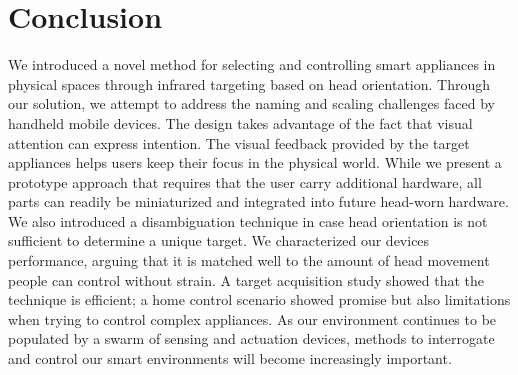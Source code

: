 \documentclass{sigchi}
\begin{document}
\section{Conclusion}
We introduced a novel method for selecting and controlling smart appliances in physical spaces through infrared targeting based on head orientation. Through our solution, we attempt to address the naming and scaling challenges faced by handheld mobile devices. The design takes advantage of the fact that visual attention can express intention. The visual feedback provided by the target appliances helps users keep their focus in the physical world. While we present a prototype approach that requires that the user carry additional hardware, all parts can readily be miniaturized and integrated into future head-worn hardware. We also introduced a disambiguation technique in case head orientation is not sufficient to determine a unique target. We characterized our devices performance, arguing that it is matched well to the amount of head movement people can control without strain. A target acquisition study showed that the technique is efficient; a home control scenario showed promise but also limitations when trying to control complex appliances. As our environment continues to be populated by a swarm of sensing and actuation devices, methods to interrogate and control our smart environments will become increasingly important.


\balance
\end{document}
